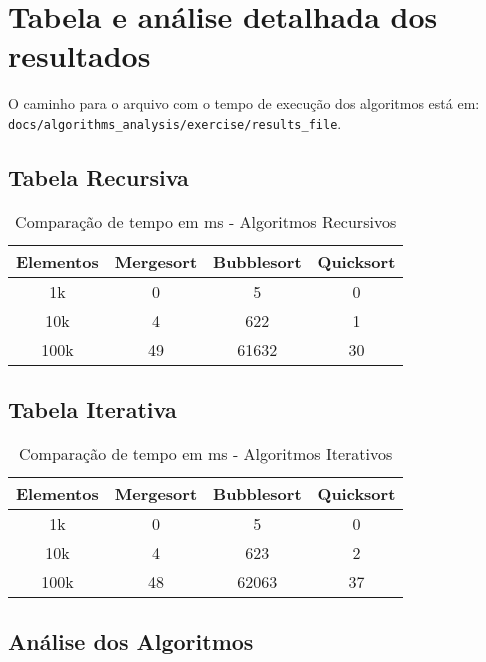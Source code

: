 \section{Tabela e análise detalhada dos resultados}

O caminho para o arquivo com o tempo de execução dos algoritmos está em: \newline
\texttt{docs/algorithms\_analysis/exercise/results\_file}.

\subsection{Tabela Recursiva}

\begin{table}[H]
    \centering
    \begin{tabular}{|c|c|c|c|}
        \hline
        \textbf{Elementos} & \textbf{Mergesort} & \textbf{Bubblesort} & \textbf{Quicksort} \\ \hline
        1k & 0 & 5 & 0 \\ \hline
        10k & 4 & 622 & 1 \\ \hline
        100k & 49 & 61632 & 30 \\ \hline
    \end{tabular}
    \caption{Comparação de tempo em ms - Algoritmos Recursivos}
\end{table}

\subsection{Tabela Iterativa}

\begin{table}[H]
    \centering
    \begin{tabular}{|c|c|c|c|}
        \hline
        \textbf{Elementos} & \textbf{Mergesort} & \textbf{Bubblesort} & \textbf{Quicksort} \\ \hline
        1k & 0 & 5 & 0 \\ \hline
        10k & 4 & 623 & 2 \\ \hline
        100k & 48 & 62063 & 37 \\ \hline
    \end{tabular}
    \caption{Comparação de tempo em ms - Algoritmos Iterativos}
\end{table}

\subsection{Análise dos Algoritmos}





